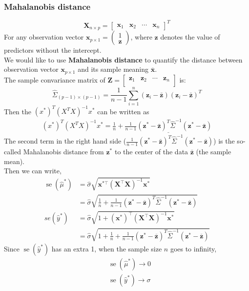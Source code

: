 \documentclass[11pt,a4paper]{article}
\begin{document}
\subsubsection{Mahalanobis distance}
$$\mathbf{X}_{n\times p}=\begin{bmatrix}
    \mathbf{x}_1&\mathbf{x}_2&\cdots&\mathbf{x}_n
\end{bmatrix}^T$$
For any observation vector $\mathbf{x}_{p\times 1}=\begin{pmatrix}
    1\\
    \mathbf{z}
\end{pmatrix}$, where $\mathbf{z}$ denotes the value of predictors without the intercept.\\
We would like to use \textbf{Mahalanobis distance} to quantify the distance between observation vector $\mathbf{x}_{p\times 1}$ and its sample meaning $\bar{\mathbf{x}}$.\\
The sample convariance matrix of $\mathbf{Z}=\begin{bmatrix}
    \mathbf{z}_1&\mathbf{z}_2&\cdots&\mathbf{z}_n\\
\end{bmatrix}$ is:
$$\hat{\Sigma}_{(p-1)\times(p-1)}=\frac{1}{n-1}\sum_{i=1}^n(\mathbf{z}_i-\bar{\mathbf{z}})(\mathbf{z}_i-\bar{\mathbf{z}})^T$$
Then the $(x^*)^T(X^TX)^{-1}x^*$ can be written as
\begin{equation}
    \begin{aligned}
        (x^*)^T(X^TX)^{-1}x^*=\frac{1}{n}+\underline{\frac{1}{n-1}(\mathbf{z}^*-\bar{\mathbf{z}})^T\hat{\Sigma}^{-1}(\mathbf{z}^*-\bar{\mathbf{z}})}
    \end{aligned}
    \nonumber
\end{equation}
The second term in the right hand side ($\frac{1}{n-1}(\mathbf{z}^*-\bar{\mathbf{z}})^T\hat{\Sigma}^{-1}(\mathbf{z}^*-\bar{\mathbf{z}})$) is the so-called Mahalanobis distance from $\mathbf{z}^*$ to the center of the data $\bar{\mathbf{z}}$ (the sample mean).\\
Then we can write,
$$
\begin{aligned}
\operatorname{se}\left(\hat{\mu}^{*}\right) &=\hat{\sigma} \sqrt{\mathbf{x}^{* \top}\left(\mathbf{X}^{\top} \mathbf{X}\right)^{-1} \mathbf{x}^{*}} \\
&=\hat{\sigma} \sqrt{\frac{1}{n}+\frac{1}{n-1}\left(\mathbf{z}^{*}-\overline{\mathbf{z}}\right)^{T} \hat{\Sigma}^{-1}\left(\mathbf{z}^{*}-\overline{\mathbf{z}}\right)} \\
se\left(\hat{y}^{*}\right) &=\hat{\sigma} \sqrt{1+\left(\mathbf{x}^{*}\right)^{\top}\left(\mathbf{X}^{\top} \mathbf{X}\right)^{-1} \mathbf{x}^{*}} \\
&=\hat{\sigma} \sqrt{1+\frac{1}{n}+\frac{1}{n-1}\left(\mathbf{z}^{*}-\overline{\mathbf{z}}\right)^{T} \hat{\Sigma}^{-1}\left(\mathbf{z}^{*}-\overline{\mathbf{z}}\right)}
\end{aligned}
$$
Since $\operatorname{se}\left(\hat{y}^{*}\right)$ has an extra 1, when the sample size $n$ goes to infinity,
$$
\begin{aligned}
&\operatorname{se}\left(\hat{\mu}^{*}\right) \rightarrow 0 \\
&\operatorname{se}\left(\hat{y}^{*}\right) \rightarrow \sigma
\end{aligned}
$$
\end{document}
